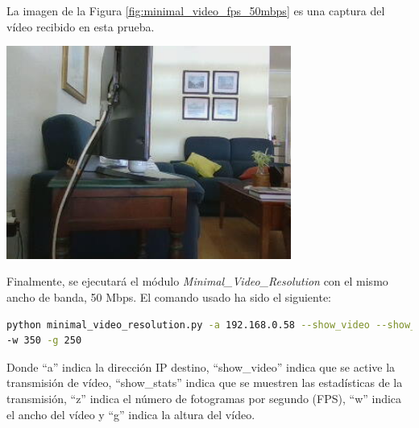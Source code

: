 \newpage

La imagen de la Figura \ref{fig:minimal_video_fps_50mbps} es una captura del vídeo recibido en esta prueba.
\begin{center}
  \includegraphics[width = 0.7\textwidth]{images/VideoRecibido3.2.png}
  \label{fig:minimal_video_fps_50mbps}
\end{center}

\newpage
Finalmente, se ejecutará el módulo \textit{Minimal\_Video\_Resolution} con el mismo ancho de banda, 50 Mbps. El comando usado ha sido el siguiente:

\begin{lstlisting}[language=bash,basicstyle=\ttfamily\scriptsize]
python minimal_video_resolution.py -a 192.168.0.58 --show_video --show_stats -z 12 \\
-w 350 -g 250
\end{lstlisting}
Donde ``a'' indica la dirección IP destino, ``show\_video'' indica que se active la transmisión de vídeo, ``show\_stats'' indica que se muestren las estadísticas de la transmisión, ``z'' indica el número de fotogramas por segundo (FPS), ``w'' indica el ancho del vídeo y ``g'' indica la altura del vídeo.
\vspace{\baselineskip}


